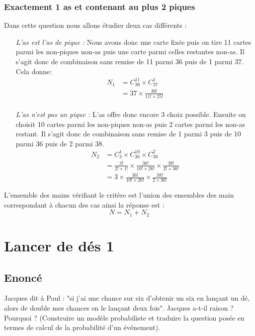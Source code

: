 \documentclass[10pt,a4paper,twoside]{article}
\begin{document}
\subsubsection{Exactement 1 as et contenant au plus 2 piques}
Dans cette question nous allons étudier deux cas différents :
\begin{itemize}
\item[\textit{L'as est l'as de pique :}] Nous avons donc une carte fixée puis on tire 11 cartes parmi les non-piques non-as puis une carte parmi celles restantes non-as. Il s'agit donc de combinaison sans remise de 11 parmi 36 puis de 1 parmi 37. Cela donne:
\begin{align*}
N_{1} & = C^{11}_{36} \times C^{1}_{37}\\
  & = 37\times \frac{36!}{11!\times 25!}\\
\end{align*}
\item[\textit{L'as n'est pas un pique :}] L'as offre donc encore 3 choix possible. Ensuite on choisit 10 cartes parmi les non-piques non-as puis 2 cartes parmi les non-as restant. Il s'agit donc de combinaison sans remise de 1 parmi 3 puis de 10 parmi 36 puis de 2 parmi 38. 
\begin{align*}
N_{2} & = C^{1}_{3}\times C^{10}_{36} \times C^{2}_{38}\\
      & = \frac{3!}{2! \times 1!} \times \frac{36!}{10! \times 26!} \times \frac{38!}{2! \times 36!}\\
      & = 3 \times \frac{36!}{10! \times 26!} \times \frac{38!}{2\times 36!}
\end{align*}
\end{itemize}
L'ensemble des mains vérifiant le critère est l'union des ensembles des main correspondant à chacun des cas ainsi la réponse est :
$$N = N_{1}+N_{2}$$

\section{Lancer de dés 1}
\subsection*{Enoncé} 
Jacques dit à Paul : "si j'ai une chance sur six d'obtenir un six en lançant un dé, alors de double mes chances en le lançant deux fois". Jacques a-t-il raison ? Pourquoi ? (Construire un modèle probabiliste et traduire la question posée en termes de calcul de la probabilité d'un événement).
\end{document}
